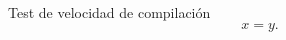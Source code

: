 \documentclass{article}
\begin{document}
Test de velocidad de compilación
\begin{equation*}
    x=y.
\end{equation*}
\end{document}

